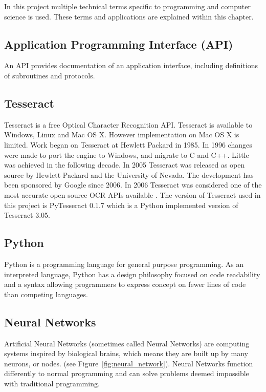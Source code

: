 \documentclass[../main.tex]{subfiles}
\begin{document}
In this project multiple technical terms specific to programming and computer
science is used. These terms and applications are explained within this
chapter.  

\subsection{Application Programming Interface (API)}

An API provides documentation of an application interface, including
definitions of subroutines and protocols. 

\subsection{Tesseract}

Tesseract is a free Optical Character Recognition API\@. Tesseract is available to Windows, Linux and Mac OS X. However implementation on Mac OS X is limited.  Work began on Tesseract at Hewlett Packard in 1985. In 1996 changes were made to port the engine to Windows, and migrate to C and C++. Little was achieved in the following decade. In 2005 Tesseract was released as open source by Hewlett Packard and the University of Nevada. The development has been sponsored by Google since 2006. In 2006 Tesseract was considered one of the most accurate open source OCR APIs available \cite{googlecode_tesseract}. The version of Tesseract used in this project is PyTesseract 0.1.7 which is a Python implemented version of Tesseract 3.05.

\subsection{Python}

Python is a programming language for general purpose programming. As an
interpreted language, Python has a design philosophy focused on code
readability and a syntax allowing programmers to express concept on fewer
lines of code than competing languages. 

\subsection{Neural Networks}

Artificial Neural Networks (sometimes called Neural Networks) are computing
systems inspired by biological brains, which means they are built up by many
neurons, or nodes. (see Figure~\ref{fig:neural_network}). Neural Networks
function differently to normal programming and can solve problems deemed 
impossible with traditional programming. 
\end{document}
